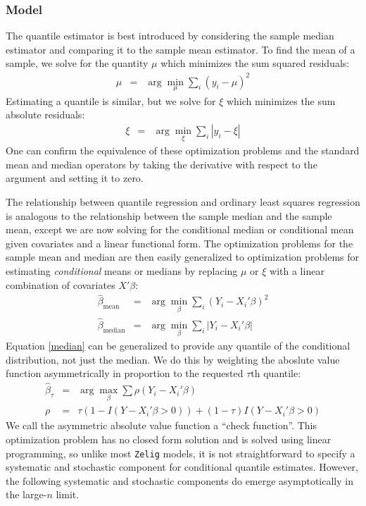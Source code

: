 \subsubsection{Model}
The quantile estimator is best introduced by considering the sample median
estimator and comparing it to the sample mean estimator.
To find the mean of a sample, we solve
for the quantity $\mu$ which minimizes the sum squared residuals:
\begin{eqnarray*}
    \mu &=& \arg\min_\mu \sum_i (y_i-\mu)^2
\end{eqnarray*}
Estimating a quantile is similar, but we solve for $\xi$ which minimizes the
sum absolute residuals:
\begin{eqnarray*}
    \xi &=& \arg\min_\xi \sum_i |y_i-\xi|
\end{eqnarray*}
One can confirm the equivalence of these optimization problems and the standard
mean and median operators by taking the derivative with respect to the argument
and setting it to zero.

The relationship between quantile regression and ordinary least squares regression
is analogous to the relationship between the sample median and the sample mean, except
we are now solving for the conditional median or conditional mean given covariates and
a linear functional form. The optimization problems for the sample mean and median
are then easily generalized to optimization problems for
estimating \emph{conditional} means or medians by replacing $\mu$ or $\xi$
with a linear combination of covariates $X'\beta$:
\begin{eqnarray}
    \hat\beta_\mathrm{mean} &=& \arg\min_\beta \sum_i (Y_i-X_i'\beta)^2 \nonumber \\
    \hat\beta_\mathrm{median} &=& \arg\min_\beta \sum_i |Y_i-X_i'\beta| \label{median}
\end{eqnarray}
Equation \ref{median} can be generalized to provide any quantile of the conditional
distribution, not just the median. We do this by weighting the aboslute value function
asymmetrically in proportion to the requested $\tau$th quantile:
\begin{eqnarray}
    \hat\beta_{\tau} &=& \arg\max_\beta \sum \rho(Y_i-X_i'\beta) \label{beta}\\
    \rho &=& \tau(1-I(Y-X_i'\beta > 0)) + (1-\tau)I(Y-X_i'\beta > 0) \nonumber
\end{eqnarray}
We call the asymmetric absolute value function a ``check function''. This optimization
problem has no closed form solution and is solved using linear programming,
so unlike most {\tt Zelig} models, it is not straightforward to specify a systematic and
stochastic component for conditional quantile estimates. However, the following systematic
and stochastic components do emerge asymptotically in the large-$n$ limit.

